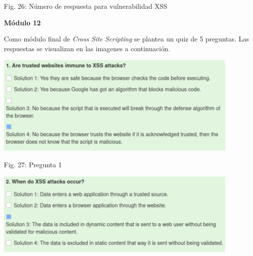 \documentclass[12pt,oneside,a4paper]{book}
\begin{document}
\begin{enumerate}
\begin{enumerate}
\begin{center}
            Fig. 26: Número de respuesta para vulnerabilidad XSS
        \end{center}
        
        \vspace{2em}

        \textbf{Módulo 12}
        
        \vspace{1em}

        \hspace{20pt}
        Como módulo final de \textit{Cross Site Scripting} se plantea un quiz de 5 preguntas. Las respuestas se visualizan en las imagenes a continuación.
        
        \vspace{2em}

        \begin{center}
            \includegraphics[width=12cm]{img/xss13.png}
            
            \vspace{0.1em}
            
            Fig. 27: Pregunta 1
        \end{center}
        
        \vspace{2em}

        \begin{center}
            \includegraphics[width=12cm]{img/xss14.png}
            
            \vspace{0.1em}
            

\end{center}
\end{enumerate}
\end{enumerate}
\end{document}
